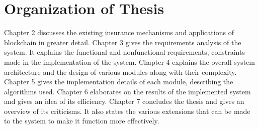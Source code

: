 \section{Organization of Thesis} %
Chapter 2 discusses the existing insurance mechanisms
and applications of blockchain in greater detail. Chapter 3 gives the
requirements analysis of the system. It explains the functional and nonfunctional requirements, constraints made in the implementation of the system. Chapter 4 explains the overall system architecture and the design of various modules along with their complexity. Chapter 5 gives the implementation details of each module, describing the algorithms used. Chapter 6 elaborates on the results of the implemented system and gives an idea of its efficiency. Chapter 7 concludes the thesis and gives an overview of its criticisms. It also states the various extensions that can be made to the system to make it function more effectively.
